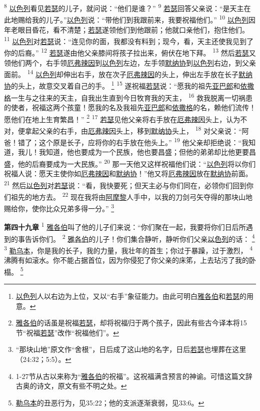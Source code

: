 \textsuperscript{8}
\uline{以色列}看见\uline{若瑟}的儿子，就问说：“他们是谁？”
\textsuperscript{9}
\uline{若瑟}回答父亲说：“是天主在此地赐给我的儿子。”\uline{以色列}说：“带他们到我跟前来，我要祝福他们。”
\textsuperscript{10}
\uline{以色列}因年老眼目昏花，看不清楚；\uline{若瑟}遂领他们到他跟前；他就口亲他们，抱住他们。
\textsuperscript{11}
\uline{以色列}对\uline{若瑟}说：“连见你的面，我都没有料到；现今，看，天主还使我见到了你的后裔。”
\textsuperscript{12}
\uline{若瑟}遂由他父亲膝间将孩子拉出来，俯伏在地下拜。
\textsuperscript{13}
然后\uline{若瑟}又领他们两个，右手领\uline{厄弗辣因}到\uline{以色列}左边，左手领\uline{默纳协}到\uline{以色列}右边，到父亲面前。
\textsuperscript{14}
\uline{以色列}却伸出右手，放在次子\uline{厄弗辣因}的头上，伸出左手放在长子\uline{默纳协}的头上，故意交叉着自己的手。
\footnote{\uline{以色列}人以右边为上位，又以“右手”象征能力。由此可明白\uline{雅各伯}和\uline{若瑟}的用意。}
\textsuperscript{15}
遂祝福\uline{若瑟}说：“愿我的祖先\uline{亚巴郎}和\uline{依撒格}一生与之往来的天主，自我出生直到今日牧育我的天主，
\textsuperscript{16}
救我脱离一切祸患的使者，祝福这两个孩童！愿我的名及我祖先\uline{亚巴郎}和\uline{依撒格}的名，赖他们流传！愿他们在地上生育繁昌！”
\footnote{\uline{雅各伯}的话虽是祝福\uline{若瑟}，却将祝福归于两个孩子，因此有些古今译本将15节“祝福\uline{若瑟}”改作“祝福他们”。}
\textsuperscript{17}
\uline{若瑟}见他父亲将右手放在\uline{厄弗辣因}头上，认为不对，便拿起父亲的右手，由\uline{厄弗辣因}头上，移到\uline{默纳协}头上，
\textsuperscript{18}
对父亲说：“阿爸！错了；这个原是长子，应将你的右手放在他头上。”
\textsuperscript{19}
他父亲却拒绝说：“我知道，我儿！我知道，他也要成为一个民族，他也要昌盛；但他的弟弟却比他更要昌盛，他的后裔要成为一大民族。”
\textsuperscript{20}
那一天他又这样祝福他们说：“\uline{以色列}将以你们祝福人说：愿天主使你如\uline{厄弗辣因}和\uline{默纳协}！”他又将\uline{厄弗辣因}放在\uline{默纳协}前面。
\textsuperscript{21}
然后\uline{以色列}对\uline{若瑟}说：“看，我快要死；但天主必与你们同在，必领你们回到你们祖先的地方去。
\textsuperscript{22}
现在我将由\uline{阿摩黎}人手中，以我的刀剑弓矢夺得的那块山地赐给你，使你比众兄弟多得一分。”
\footnote{“那块山地”原文作“舍根”，日后成了这山地的名字，日后\uline{若瑟}也埋葬在这里（24:32；5:5）。}

\textbf{第四十九章\quad}
\textsuperscript{1}
\uline{雅各伯}叫了他的儿子们来说：“你们聚在一起，我要将你们日后所遇到的事告诉你们。
\textsuperscript{2}
\uline{雅各伯}的儿子！你们集合静听，静听你们父亲\uline{以色列}的话：
\footnote{1-27节从古以来称为“\uline{雅各伯}的祝福”。这祝福满含预言的神谕。可惜这篇文辞古奥的诗文，原文有些不明之处。}
\textsuperscript{3}
\uline{勒乌本}，你是我的长子，我的力量，我壮年的首生；你过于暴躁，过于激烈，
\textsuperscript{4}
沸腾有如滚水。你不能占据首位，因为你侵犯了你父亲的床笫，上去玷污了我的卧榻。
\footnote{\uline{勒乌本}的丑恶行为，见35:22；他的支派逐渐衰弱，见33:6。}

